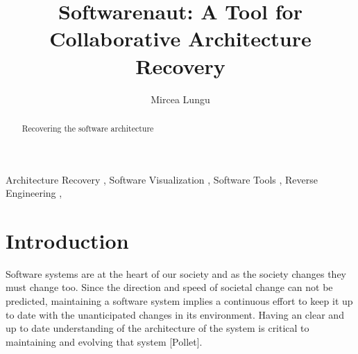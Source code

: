 \documentclass[preprint,12pt]{elsarticle}
\begin{document}
\begin{frontmatter}



\title{Softwarenaut: A Tool for Collaborative Architecture Recovery}


\author{Mircea Lungu}

\address{Software Composition Group\\University of Bern\\Switzerland}

\begin{abstract}
Recovering the software architecture
\end{abstract}

\begin{keyword}
Architecture Recovery \sep
Software Visualization \sep
Software Tools \sep
Reverse Engineering \sep
\end{keyword}

\end{frontmatter}


\section{Introduction}
\label{sec:Introduction}

Software systems are at the heart of our society and as the society changes they must change too. Since the direction and speed of societal change can not be predicted, maintaining a software system implies a continuous effort to keep it up to date with the unanticipated changes in its environment. Having an clear and up to date understanding of the architecture of the system is critical to maintaining and evolving that system [Pollet].
\end{document}
